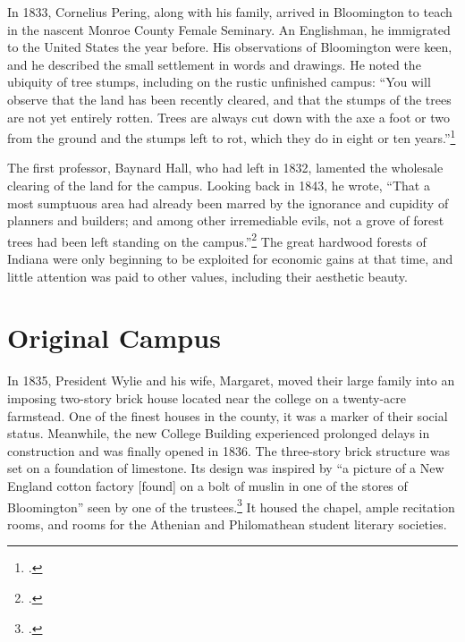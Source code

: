 \documentclass[
  american,
  letterpaper,
]{scrreprt}
\begin{document}
In 1833, Cornelius Pering, along with his family, arrived in Bloomington
to teach in the nascent Monroe County Female Seminary. An Englishman, he
immigrated to the United States the year before. His observations of
Bloomington were keen, and he described the small settlement in words
and drawings. He noted the ubiquity of tree stumps, including on the
rustic unfinished campus: ``You will observe that the land has been
recently cleared, and that the stumps of the trees are not yet entirely
rotten. Trees are always cut down with the axe a foot or two from the
ground and the stumps left to rot, which they do in eight or ten
years.''\footnote{.}

The first professor, Baynard Hall, who had left in 1832, lamented the
wholesale clearing of the land for the campus. Looking back in 1843, he
wrote, ``That a most sumptuous area had already been marred by the
ignorance and cupidity of planners and builders; and among other
irremediable evils, not a grove of forest trees had been left standing
on the campus.''\footnote{.} The
great hardwood forests of Indiana were only beginning to be exploited
for economic gains at that time, and little attention was paid to other
values, including their aesthetic beauty.

\section{Original Campus}\label{original-campus}

In 1835, President Wylie and his wife, Margaret, moved their large
family into an imposing two-story brick house located near the college
on a twenty-acre farmstead. One of the finest houses in the county, it
was a marker of their social status. Meanwhile, the new College Building
experienced prolonged delays in construction and was finally opened in
1836. The three-story brick structure was set on a foundation of
limestone. Its design was inspired by ``a picture of a New England
cotton factory {[}found{]} on a bolt of muslin in one of the stores of
Bloomington'' seen by one of the trustees.\footnote{.} It
housed the chapel, ample recitation rooms, and rooms for the Athenian
and Philomathean student literary societies.
\end{document}
